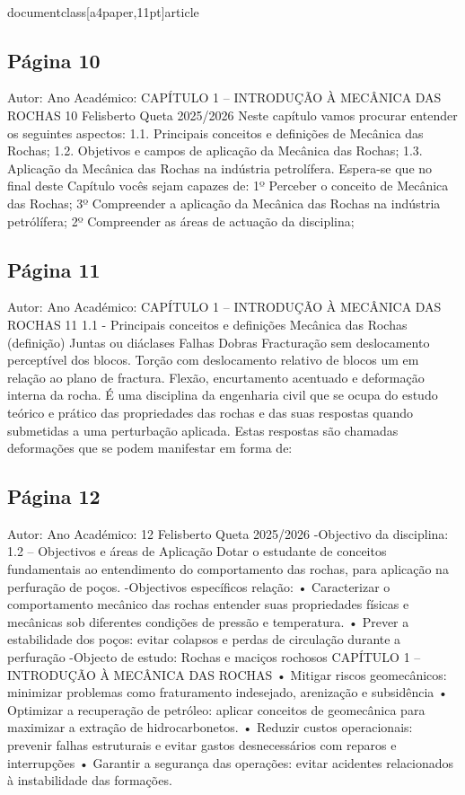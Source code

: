 \\documentclass[a4paper,11pt]{article}
\begin{document}
\subsection*{Página 10}
Autor:
Ano Académico:
CAPÍTULO 1 – INTRODUÇÃO À MECÂNICA DAS ROCHAS
10
Felisberto Queta
2025/2026
Neste capítulo vamos procurar entender os seguintes aspectos:
1.1. Principais conceitos e definições de Mecânica das Rochas;
1.2. Objetivos e campos de aplicação da Mecânica das Rochas;
1.3. Aplicação da Mecânica das Rochas na indústria petrolífera.
Espera-se que no final deste Capítulo vocês sejam capazes de:
1º Perceber o conceito de Mecânica das Rochas; 
3º Compreender a aplicação da Mecânica das Rochas na indústria petrólífera;
2º Compreender as áreas de actuação da disciplina;



\subsection*{Página 11}
Autor:
Ano Académico:
CAPÍTULO 1 – INTRODUÇÃO À MECÂNICA DAS ROCHAS
11
1.1 - Principais conceitos e definições 
Mecânica das Rochas (definição)
Juntas ou diáclases
Falhas
Dobras
Fracturação sem 
deslocamento perceptível dos 
blocos.
Torção com deslocamento 
relativo de blocos um em 
relação ao plano de fractura.
Flexão,  encurtamento
acentuado e deformação
interna da rocha.
É uma disciplina da engenharia civil que se ocupa do estudo teórico e prático das propriedades das
rochas e das suas respostas quando submetidas a uma perturbação aplicada. Estas respostas são
chamadas deformações que se podem manifestar em forma de:



\subsection*{Página 12}
Autor:
Ano Académico:
12
Felisberto Queta
2025/2026
-Objectivo da disciplina:
1.2 – Objectivos e áreas de Aplicação
Dotar o estudante de conceitos fundamentais ao entendimento do comportamento das rochas, para aplicação na perfuração
de poços.
-Objectivos específicos relação:
•
Caracterizar
o
comportamento
mecânico das rochas
entender suas propriedades físicas e mecânicas sob diferentes condições de
pressão e temperatura.
• Prever a estabilidade dos poços:
evitar colapsos e perdas de circulação durante a perfuração
-Objecto de estudo:
Rochas e maciços rochosos
CAPÍTULO 1 – INTRODUÇÃO À MECÂNICA DAS ROCHAS
• Mitigar riscos geomecânicos:
minimizar problemas como fraturamento indesejado, arenização e subsidência
• Optimizar a recuperação de petróleo:
aplicar
conceitos
de
geomecânica
para
maximizar
a
extração
de
hidrocarbonetos.
• Reduzir custos operacionais:
prevenir falhas estruturais e evitar gastos desnecessários com reparos e
interrupções
• Garantir a segurança das operações:
evitar acidentes relacionados à instabilidade das formações.
\end{document}
